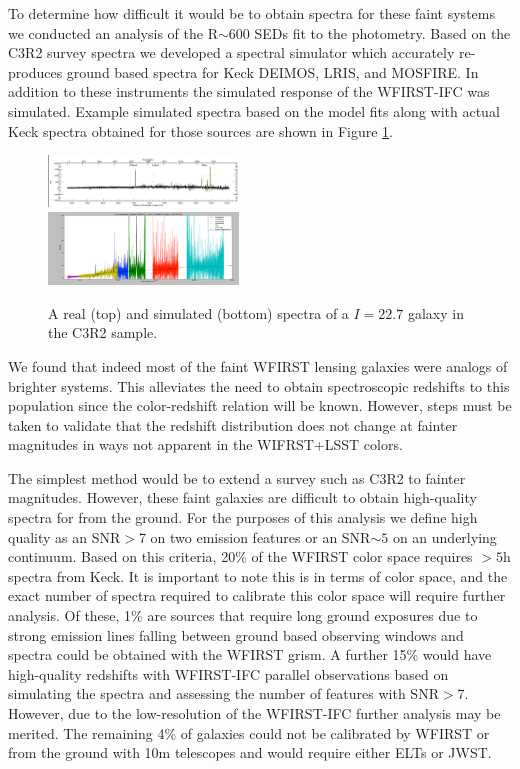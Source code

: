 To determine how difficult it would be to obtain spectra for these faint systems
we conducted an analysis of the R$\sim$600 SEDs fit to the photometry.  Based on
the C3R2 survey spectra \citep{Masters2017} we developed a spectral simulator
which accurately re-produces ground based spectra for Keck DEIMOS, LRIS, and
MOSFIRE.  In addition to these instruments the simulated response of the
WFIRST-IFC was simulated.  Example simulated spectra based on the model fits
along with actual Keck spectra obtained for those sources are shown in Figure
\ref{fig:SpecSim}.

\begin{figure}
\centering
 \includegraphics[trim=0cm 0cm 0cm 0cm, clip,width=0.45\textwidth] {Plots/realspec.png}\\
   \includegraphics[trim=0cm 0cm 0cm 0cm, clip,width=0.45\textwidth] {Plots/simspec.png}

\caption{ A real (top) and simulated (bottom) spectra of a $I=22.7$ galaxy in the C3R2 sample.}
\label{fig:SpecSim}
\end{figure}

We found that indeed most of the faint WFIRST lensing galaxies were analogs of
brighter systems. This alleviates the need to obtain spectroscopic redshifts to
this population since the color-redshift relation will be known.  However, steps
must be taken to validate that the redshift distribution does not change at
fainter magnitudes in ways not apparent in the WIFRST+LSST colors.

The simplest method would be to extend a survey such as C3R2 \citep{Masters2017}
to fainter magnitudes. However, these faint galaxies are difficult to obtain
high-quality spectra for from the ground.  For the purposes of this analysis we
define high quality as an SNR$>$7 on two emission features or an SNR$\sim5$ on
an underlying continuum.  Based on this criteria, 20\% of the WFIRST color space
requires $>5$h spectra from Keck.  It is important to note this is in terms of
color space, and the exact number of spectra required to calibrate this color
space will require further analysis.   Of these, 1\% are sources that require
long ground exposures due to strong emission lines falling between ground based
observing windows and spectra could be obtained with the WFIRST grism.  A
further 15\% would have high-quality redshifts with WFIRST-IFC parallel
observations based on simulating the spectra and assessing the number of
features with SNR$>$7.  However, due to the low-resolution of the WFIRST-IFC
further analysis may be merited.   The remaining 4\% of galaxies could not be
calibrated by WFIRST or from the ground with 10m telescopes and would require
either ELTs or JWST.

